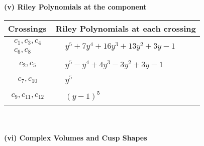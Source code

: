 \documentclass[1p]{elsarticle_modified}
\theoremstyle{definition}
\begin{document}
\newpage\renewcommand{\arraystretch}{1}
\flushleft \textbf{(v) Riley Polynomials at the component}\newline \\
\begin{tabular}{m{50pt}|m{274pt}}
Crossings & \hspace{64pt}Riley Polynomials at each crossing \\
\hline $$\begin{aligned}c_{1},c_{3},c_{4}\\c_{6},c_{8}\end{aligned}$$&$\begin{aligned}
&y^5+7 y^4+16 y^3+13 y^2+3 y-1
\end{aligned}$\\
\hline $$\begin{aligned}c_{2},c_{5}\end{aligned}$$&$\begin{aligned}
&y^5- y^4+4 y^3-3 y^2+3 y-1
\end{aligned}$\\
\hline $$\begin{aligned}c_{7},c_{10}\end{aligned}$$&$\begin{aligned}
&y^5
\end{aligned}$\\
\hline $$\begin{aligned}c_{9},c_{11},c_{12}\end{aligned}$$&$\begin{aligned}
&(y-1)^5
\end{aligned}$\\
\hline
\end{tabular}\\~\\
\newpage\flushleft \textbf{(vi) Complex Volumes and Cusp Shapes}
\end{document}
